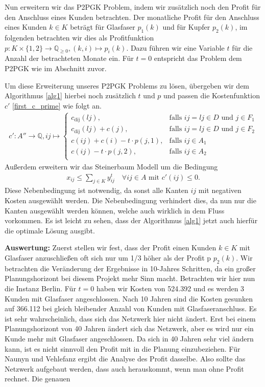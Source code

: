 \documentclass[11pt,a4paper]{article}
\newcommand{\Q}{\mathbb{Q}}
\theoremstyle{my_th_style1}
\begin{document}
Nun erweitern wir das P2PGK Problem, indem wir zusätzlich noch den Profit für den Anschluss eines Kunden betrachten.
Der monatliche Profit für den Anschluss eines Kunden $k \in K$ beträgt für Glasfaser $p_1(k)$ und für Kupfer $p_2(k)$, im folgenden betrachten wir dies als Profitfunktion $p:K \times \{1,2\} \rightarrow \Q_{ \geq 0 },(k,i) \mapsto p_i(k)$.
Dazu führen wir eine Variable $t$ für die Anzahl der betrachteten Monate ein.
Für $t=0$ entspricht das Problem dem P2PGK wie im Abschnitt zuvor.

Um diese Erweiterung unseres P2PGK Problems zu lösen, übergeben wir dem Algorithmus \ref{alg1} hierbei noch zusätzlich $t$ und $p$ und passen die Kostenfunktion \(c'\) \eqref{first_c_prime} wie folgt an.
\begin{align*}
c': A'' \rightarrow \Q, ij \mapsto \left\{\begin{array}{cl} 
c_{\text{dij}}(lj), & \text{falls } ij = lj \in D \text{ und } j \in F_1\\ 
c_{\text{dij}}(lj)+c(j), & \text{falls } ij = lj \in D \text{ und } j \in F_2\\ 
c(ij) + c(i) - t \cdot p(j,1), & \text{falls } ij \in A_1\\ 
c(ij) - t \cdot p(j,2), & \text{falls } ij \in A_2\\ 
\end{array}
\right.
\end{align*}
Außerdem erweitern wir das Steinerbaum Modell um die Bedingung 
\begin{align*}
	x_{ij} \leq \displaystyle\sum_{j \in K} y_{ij}^t \quad \forall ij \in A \text{ mit } c'(ij) \leq 0.
\end{align*}
Diese Nebenbedingung ist notwendig, da sonst alle Kanten $ij$ mit negativen Kosten ausgewählt werden.
Die Nebenbedingung verhindert dies, da nun nur die Kanten ausgew\"ahlt werden können, welche auch wirklich in dem Fluss vorkommen.
Es ist leicht zu sehen, dass der Algorithmus \ref{alg1} jetzt auch hierfür die optimale Lösung ausgibt. 

\textbf{Auswertung:}
Zuerst stellen wir fest, dass der Profit einen Kunden $k \in K$ mit Glasfaser anzuschließen oft sich nur um 1/3 höher als der Profit p $p_2(k)$. 
Wir betrachten die Veränderung der Ergebnisse in 10-Jahres Schritten, da ein großer Planungshorizont bei diesem Projekt mehr Sinn macht.
Betrachten wir hier nun die Instanz Berlin. Für $t=0$ haben wir Kosten von 524.392 und es werden 3 Kunden mit Glasfaser angeschlossen. Nach 10 Jahren sind die Kosten gesunken auf 366.112 bei gleich bleibender Anzahl von Kunden mit Glasfaseranschluss. Es ist sehr wahrscheinlich, dass sich das Netzwerk hier nicht ändert. Erst bei einem Planungshorizont von 40 Jahren ändert sich das Netzwerk, aber es wird nur ein Kunde mehr mit Glasfaser angeschlossen. Da sich in 40 Jahren sehr viel ändern kann, ist es nicht sinnvoll den Profit mit in die Planung einzubeziehen. Für Naunyn und Vehlefanz ergibt die Analyse des Profit dasselbe. Also sollte das Netzwerk aufgebaut werden, dass auch herauskommt, wenn man ohne Profit rechnet. Die genauen 
\end{document}
